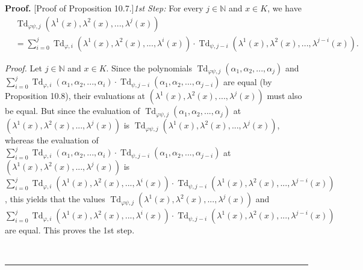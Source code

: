 \documentclass[numbers=enddot,12pt,final,onecolumn,notitlepage]{scrartcl}%
\newenvironment{proof}[1][Proof]{\noindent\textbf{#1.} }{\ \rule{0.5em}{0.5em}}
\begin{document}
\begin{proof}
[Proof of Proposition 10.7.]\textit{1st Step:} For every $j\in\mathbb{N}$ and
$x\in K$, we have%
\begin{align*}
&  \operatorname*{Td}\nolimits_{\varphi\psi,j}\left(  \lambda^{1}\left(
x\right)  ,\lambda^{2}\left(  x\right)  ,...,\lambda^{j}\left(  x\right)
\right) \\
&  =\sum\limits_{i=0}^{j}\operatorname*{Td}\nolimits_{\varphi,i}\left(
\lambda^{1}\left(  x\right)  ,\lambda^{2}\left(  x\right)  ,...,\lambda
^{i}\left(  x\right)  \right)  \cdot\operatorname*{Td}\nolimits_{\psi
,j-i}\left(  \lambda^{1}\left(  x\right)  ,\lambda^{2}\left(  x\right)
,...,\lambda^{j-i}\left(  x\right)  \right)  .
\end{align*}


\textit{Proof.} Let $j\in\mathbb{N}$ and $x\in K$. Since the polynomials
$\operatorname*{Td}\nolimits_{\varphi\psi,j}\left(  \alpha_{1},\alpha
_{2},...,\alpha_{j}\right)  $ and $\sum\limits_{i=0}^{j}\operatorname*{Td}%
\nolimits_{\varphi,i}\left(  \alpha_{1},\alpha_{2},...,\alpha_{i}\right)
\cdot\operatorname*{Td}\nolimits_{\psi,j-i}\left(  \alpha_{1},\alpha
_{2},...,\alpha_{j-i}\right)  $ are equal (by Proposition 10.8), their
evaluations at $\left(  \lambda^{1}\left(  x\right)  ,\lambda^{2}\left(
x\right)  ,...,\lambda^{j}\left(  x\right)  \right)  $ must also be equal. But
since the evaluation of $\operatorname*{Td}\nolimits_{\varphi\psi,j}\left(
\alpha_{1},\alpha_{2},...,\alpha_{j}\right)  $ at \newline$\left(  \lambda
^{1}\left(  x\right)  ,\lambda^{2}\left(  x\right)  ,...,\lambda^{j}\left(
x\right)  \right)  $ is $\operatorname*{Td}\nolimits_{\varphi\psi,j}\left(
\lambda^{1}\left(  x\right)  ,\lambda^{2}\left(  x\right)  ,...,\lambda
^{j}\left(  x\right)  \right)  $, whereas the evaluation of $\sum
\limits_{i=0}^{j}\operatorname*{Td}\nolimits_{\varphi,i}\left(  \alpha
_{1},\alpha_{2},...,\alpha_{i}\right)  \cdot\operatorname*{Td}\nolimits_{\psi
,j-i}\left(  \alpha_{1},\alpha_{2},...,\alpha_{j-i}\right)  $ at $\left(
\lambda^{1}\left(  x\right)  ,\lambda^{2}\left(  x\right)  ,...,\lambda
^{j}\left(  x\right)  \right)  $ is \newline$\sum\limits_{i=0}^{j}%
\operatorname*{Td}\nolimits_{\varphi,i}\left(  \lambda^{1}\left(  x\right)
,\lambda^{2}\left(  x\right)  ,...,\lambda^{i}\left(  x\right)  \right)
\cdot\operatorname*{Td}\nolimits_{\psi,j-i}\left(  \lambda^{1}\left(
x\right)  ,\lambda^{2}\left(  x\right)  ,...,\lambda^{j-i}\left(  x\right)
\right)  $, this yields that the values $\operatorname*{Td}\nolimits_{\varphi
\psi,j}\left(  \lambda^{1}\left(  x\right)  ,\lambda^{2}\left(  x\right)
,...,\lambda^{j}\left(  x\right)  \right)  $ and \newline$\sum\limits_{i=0}%
^{j}\operatorname*{Td}\nolimits_{\varphi,i}\left(  \lambda^{1}\left(
x\right)  ,\lambda^{2}\left(  x\right)  ,...,\lambda^{i}\left(  x\right)
\right)  \cdot\operatorname*{Td}\nolimits_{\psi,j-i}\left(  \lambda^{1}\left(
x\right)  ,\lambda^{2}\left(  x\right)  ,...,\lambda^{j-i}\left(  x\right)
\right)  $ are equal. This proves the 1st step.


\end{proof}
\end{document}
